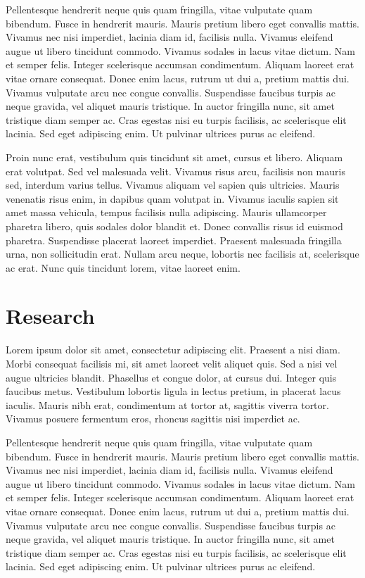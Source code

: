 \documentclass[titlepage,a4paper,12pt,thmsb]{report}
\begin{document}
Pellentesque hendrerit neque quis quam fringilla, vitae vulputate quam bibendum. Fusce in hendrerit mauris. Mauris pretium libero eget convallis mattis. Vivamus nec nisi imperdiet, lacinia diam id, facilisis nulla. Vivamus eleifend augue ut libero tincidunt commodo. Vivamus sodales in lacus vitae dictum. Nam et semper felis. Integer scelerisque accumsan condimentum. Aliquam laoreet erat vitae ornare consequat. Donec enim lacus, rutrum ut dui a, pretium mattis dui. Vivamus vulputate arcu nec congue convallis. Suspendisse faucibus turpis ac neque gravida, vel aliquet mauris tristique. In auctor fringilla nunc, sit amet tristique diam semper ac. Cras egestas nisi eu turpis facilisis, ac scelerisque elit lacinia. Sed eget adipiscing enim. Ut pulvinar ultrices purus ac eleifend.

Proin nunc erat, vestibulum quis tincidunt sit amet, cursus et libero. Aliquam erat volutpat. Sed vel malesuada velit. Vivamus risus arcu, facilisis non mauris sed, interdum varius tellus. Vivamus aliquam vel sapien quis ultricies. Mauris venenatis risus enim, in dapibus quam volutpat in. Vivamus iaculis sapien sit amet massa vehicula, tempus facilisis nulla adipiscing. Mauris ullamcorper pharetra libero, quis sodales dolor blandit et. Donec convallis risus id euismod pharetra. Suspendisse placerat laoreet imperdiet. Praesent malesuada fringilla urna, non sollicitudin erat. Nullam arcu neque, lobortis nec facilisis at, scelerisque ac erat. Nunc quis tincidunt lorem, vitae laoreet enim.

\chapter{Research}

Lorem ipsum dolor sit amet, consectetur adipiscing elit. Praesent a nisi diam. Morbi consequat facilisis mi, sit amet laoreet velit aliquet quis. Sed a nisi vel augue ultricies blandit. Phasellus et congue dolor, at cursus dui. Integer quis faucibus metus. Vestibulum lobortis ligula in lectus pretium, in placerat lacus iaculis. Mauris nibh erat, condimentum at tortor at, sagittis viverra tortor. Vivamus posuere fermentum eros, rhoncus sagittis nisi imperdiet ac.

Pellentesque hendrerit neque quis quam fringilla, vitae vulputate quam bibendum. Fusce in hendrerit mauris. Mauris pretium libero eget convallis mattis. Vivamus nec nisi imperdiet, lacinia diam id, facilisis nulla. Vivamus eleifend augue ut libero tincidunt commodo. Vivamus sodales in lacus vitae dictum. Nam et semper felis. Integer scelerisque accumsan condimentum. Aliquam laoreet erat vitae ornare consequat. Donec enim lacus, rutrum ut dui a, pretium mattis dui. Vivamus vulputate arcu nec congue convallis. Suspendisse faucibus turpis ac neque gravida, vel aliquet mauris tristique. In auctor fringilla nunc, sit amet tristique diam semper ac. Cras egestas nisi eu turpis facilisis, ac scelerisque elit lacinia. Sed eget adipiscing enim. Ut pulvinar ultrices purus ac eleifend.
\end{document}
